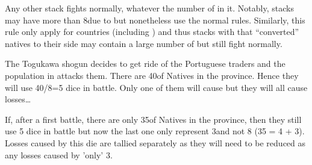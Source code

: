 Any other stack fights normally, whatever the number of \LD in it. Notably,
\TUR stacks may have more than 8\LD due to \Pashas but nonetheless use the
normal rules. Similarly, this rule only apply for \ROTW countries (including
) and thus stacks with \LeaderC that ``converted'' natives to
their side may contain a large number of \LD but still fight normally.

\begin{exemple}
  The Togukawa shogun decides to get ride of the Portuguese traders and the
  population in  attacks them. There are 40\LD of Natives in
  the province. Hence they will use 40/8=5 dice in battle. Only one of them
  will cause \textetoile but they will all cause losses\ldots

  If, after a first battle, there are only 35\LD of Natives in the province,
  then they still use 5 dice in battle but now the last one only represent
  3\LD and not 8 (35 = 4  + 3). Losses caused by this die are
  tallied separately as they will need to be reduced as any losses caused by
  'only' 3\LD.
\end{exemple}

